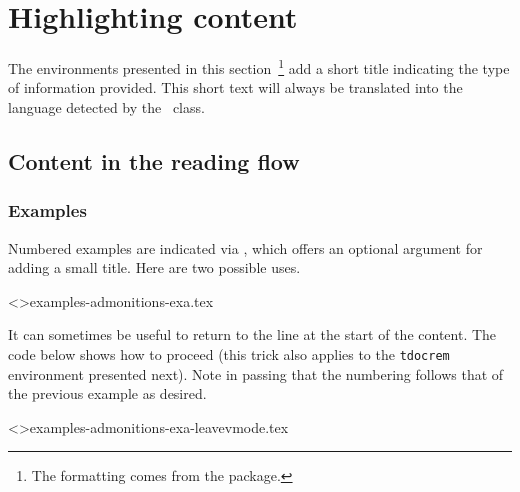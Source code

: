 
\section{Highlighting content}

\begin{tdocnote}
    The environments presented in this section\,%
    \footnote{
        The formatting comes from the  package.
    }
    add a short title indicating the type of information provided.
    This short text will always be translated into the language detected by the \thisproj\ class.
\end{tdocnote}


\subsection{Content in the reading flow}




\subsubsection{Examples}

Numbered examples are indicated via , which offers an optional argument for adding a small title.
Here are two possible uses.

\tdoclatexinput<>{examples-admonitions-exa.tex}


\begin{tdoctip}
    It can sometimes be useful to return to the line at the start of the content. The code below shows how to proceed (this trick also applies to the \verb#tdocrem# environment presented next). Note in passing that the numbering follows that of the previous example as desired.
\end{tdoctip}

\tdoclatexinput<>{examples-admonitions-exa-leavevmode.tex}



